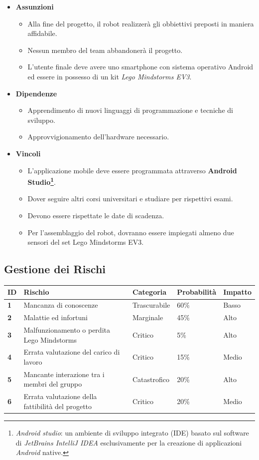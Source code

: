 \documentclass{article}
\begin{document}
\begin{itemize}
\item
\textbf{Assunzioni}

\begin{itemize}
\item
Alla fine del progetto, il robot realizzerà gli obbiettivi preposti
in maniera affidabile.
\item
Nessun membro del team abbandonerà il progetto.
\item
L'utente finale deve avere uno smartphone con sistema operativo Android ed essere in possesso di un kit \emph{Lego Mindstorms EV3}.
\end{itemize}
\item
\textbf{Dipendenze}

\begin{itemize}
\item
Apprendimento di nuovi linguaggi di programmazione e tecniche di
sviluppo.
\item
Approvvigionamento dell'hardware necessario.
\end{itemize}
\item
\textbf{Vincoli}

\begin{itemize}
\item
L'applicazione mobile deve essere programmata attraverso
\textbf{Android Studio\footnote{\emph{Android studio}: un ambiente
di sviluppo integrato (IDE) basato sul software di \emph{JetBrains
IntelliJ IDEA} esclusivamente per la creazione di applicazioni
\emph{Android} native.}}.
\item
Dover seguire altri corsi universitari e studiare per rispettivi esami.
\item
Devono essere rispettate le date di scadenza.
\item
Per l'assemblaggio del robot, dovranno essere impiegati almeno due sensori del set Lego Mindstorms EV3.
\end{itemize}
\end{itemize}

\subsection{Gestione dei Rischi}

\begin{longtable}[]{@{}lllll@{}}
\toprule
ID & Rischio & Categoria & Probabilità & Impatto\tabularnewline
\midrule
\endhead
\textbf{1} & Mancanza di conoscenze & Trascurabile & 60\% &
Basso\tabularnewline
\textbf{2} & Malattie ed infortuni & Marginale & 45\% &
Alto\tabularnewline
\textbf{3} & Malfunzionamento o perdita Lego Mindstorms & Critico & 5\% &
Alto\tabularnewline
\textbf{4} & Errata valutazione del carico di lavoro & Critico & 15\% &
Medio\tabularnewline
\textbf{5} & Mancante interazione tra i membri del gruppo & Catastrofico
& 20\% & Alto\tabularnewline
\textbf{6} & Errata valutazione della fattibilità del progetto & Critico
& 20\% & Medio\tabularnewline
\bottomrule
\end{longtable}
\end{document}

